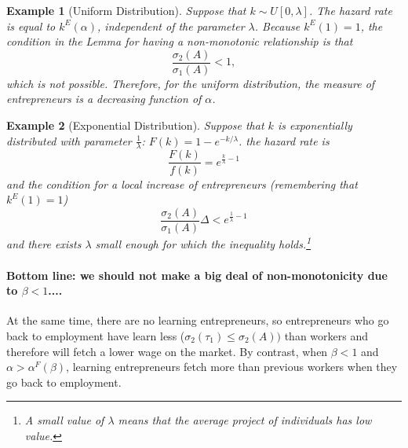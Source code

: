 \documentclass[12pt]{article}
\newtheorem{example}{Example}
\begin{document}
%
\begin{example}[Uniform Distribution]
    Suppose that $k\sim U[0,\lambda]$. The hazard rate is equal to $k^E(\alpha)$, independent of the parameter $\lambda$. Because $k^E(1)=1$, the condition in the Lemma for having a non-monotonic relationship is that
    \[
        \frac{\sigma_2(A)}{\sigma_1(A)}<1,
    \]
    which is not possible. Therefore, for the uniform distribution, the measure of entrepreneurs is a decreasing function of $\alpha$.
\end{example}

\begin{example}[Exponential Distribution]
    Suppose that $k$ is exponentially distributed with parameter $\frac{1}{\lambda}$: $F(k)=1-e^{-k/\lambda}$. 
    the hazard rate is
    \[
        \frac{F(k)}{f(k)}= e^{\frac{k}{\lambda}-1}
    \]
    and the condition for a local increase of entrepreneurs (remembering that $k^E(1)=1$)
    \[
        \frac{\sigma_2(A)}{\sigma_1(A)}\Delta <e^{\frac{1}{\lambda}-1}
    \]
and there exists $\lambda$ small enough for which the inequality holds.\footnote{%
A small value of $\lambda$ means that the average project of individuals has low value.
}
\end{example}

\paragraph{Bottom line: we should not make a big deal of non-monotonicity due to $\beta<1$....}

At the same time, there are no learning entrepreneurs, so entrepreneurs who go back to employment have learn less ($\sigma_2(\tau_1)\leq \sigma_2(A))$ than workers and therefore will fetch a lower wage on the market. By contrast, when $\beta<1$ and $\alpha>\alpha^F(\beta)$, learning entrepreneurs fetch more than previous workers when they go back to employment.
 


 
\end{document}
